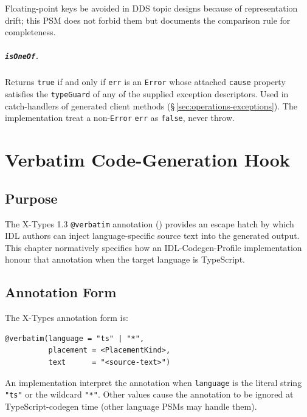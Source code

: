 \documentclass{../styles/zerodds-vendor-spec}
\begin{document}
Floating-point keys  be avoided in DDS topic
designs because of representation drift; this PSM does not
forbid them but documents the comparison rule for completeness.

\paragraph{\texttt{isOneOf}.} Returns \texttt{true} if and only if
\texttt{err} is an \texttt{Error} whose attached \texttt{cause}
property satisfies the \texttt{typeGuard} of any of the supplied
exception descriptors. Used in catch-handlers of generated client
methods (\S\,\ref{sec:operations-exceptions}). The implementation
 treat a non-\texttt{Error} \texttt{err} as
\texttt{false}, never throw.

\chapter{Verbatim Code-Generation Hook}\label{ch:verbatim}

\section{Purpose}

The X-Types 1.3 \texttt{@verbatim} annotation
() provides an escape hatch by
which IDL authors can inject language-specific source text into
the generated output. This chapter normatively specifies how an
IDL-Codegen-Profile implementation  honour that
annotation when the target language is TypeScript.

\section{Annotation Form}

The X-Types annotation form is:

\begin{lstlisting}
@verbatim(language = "ts" | "*",
          placement = <PlacementKind>,
          text      = "<source-text>")
\end{lstlisting}

An implementation  interpret the annotation when
\texttt{language} is the literal string \texttt{"ts"} or the
wildcard \texttt{"*"}. Other values  cause the
annotation to be ignored at TypeScript-codegen time (other
language PSMs may handle them).
\end{document}
